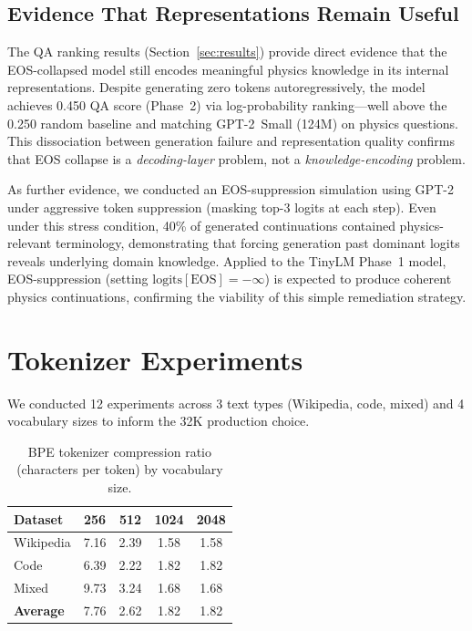 \documentclass[11pt]{article}
\begin{document}
\subsection{Evidence That Representations Remain Useful}

The QA ranking results (Section~\ref{sec:results}) provide direct evidence that the EOS-collapsed model still encodes meaningful physics knowledge in its internal representations. Despite generating zero tokens autoregressively, the model achieves 0.450 QA score (Phase~2) via log-probability ranking---well above the 0.250 random baseline and matching GPT-2~Small (124M) on physics questions. This dissociation between generation failure and representation quality confirms that EOS collapse is a \emph{decoding-layer} problem, not a \emph{knowledge-encoding} problem.

As further evidence, we conducted an EOS-suppression simulation using GPT-2 under aggressive token suppression (masking top-3 logits at each step). Even under this stress condition, 40\% of generated continuations contained physics-relevant terminology, demonstrating that forcing generation past dominant logits reveals underlying domain knowledge. Applied to the TinyLM Phase~1 model, EOS-suppression (setting $\text{logits}[\text{EOS}] = -\infty$) is expected to produce coherent physics continuations, confirming the viability of this simple remediation strategy.

\section{Tokenizer Experiments}
\label{sec:tokenizer_exp}

We conducted 12 experiments across 3 text types (Wikipedia, code, mixed) and 4 vocabulary sizes to inform the 32K production choice.

\begin{table}[t]
\centering
\caption{BPE tokenizer compression ratio (characters per token) by vocabulary size.}
\label{tab:tokenizer_exp}
\begin{tabular}{lcccc}
\toprule
\textbf{Dataset} & \textbf{256} & \textbf{512} & \textbf{1024} & \textbf{2048} \\
\midrule
Wikipedia & 7.16 & 2.39 & 1.58 & 1.58 \\
Code & 6.39 & 2.22 & 1.82 & 1.82 \\
Mixed & 9.73 & 3.24 & 1.68 & 1.68 \\
\midrule
\textbf{Average} & 7.76 & 2.62 & 1.82 & 1.82 \\
\bottomrule
\end{tabular}
\end{table}
\end{document}

